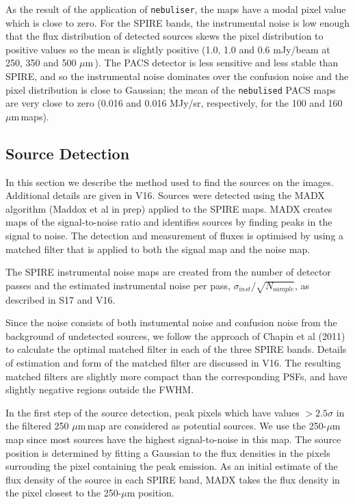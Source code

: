 \documentclass[useAMS,usenatbib]{mnras}
\def\mic{ $\mu $m\,}
\begin{document}
As the result
of the application of {\tt nebuliser}, the maps have a modal pixel value which is close to
zero. For the SPIRE bands, the instrumental noise is low enough that
the flux distribution of detected sources skews the pixel distribution to
positive values so the mean is slightly positive (1.0, 1.0 and 0.6
mJy/beam at 250, 350 and 500 \mic).
The PACS detector is less sensitive and less stable than SPIRE, and so the
instrumental noise dominates over the confusion noise and the pixel
distribution is close to Gaussian; the mean of the {\tt nebulised} PACS
maps are very close to zero (0.016 and 0.016
MJy/sr, respectively, for the 100 and 160\mic maps). 

\subsection{Source Detection} 


In this section we describe the method used to find the
sources on the images. Additional details are given in V16.
Sources were detected using the MADX algorithm (Maddox et al in prep)
applied to the SPIRE maps.  MADX creates maps of the signal-to-noise
ratio and identifies sources by finding peaks in the signal to noise. The
detection and measurement of fluxes is optimised by using a matched
filter that is applied to both the signal map and the noise map. 

The SPIRE instrumental noise maps are created from the number of
detector passes and the estimated instrumental noise per pass,
$\sigma_{\mathrm inst} /\sqrt{N_ {\mathrm sample}}$, as described in S17 and V16.

 
Since the noise consists of both instumental noise and
confusion noise from the background of undetected sources, we follow
the approach of Chapin et al (2011) to calculate the optimal matched
filter in each of the three SPIRE bands. Details of estimation and
form of the matched filter are discussed in V16.  The resulting
matched filters are slightly more compact than the corresponding PSFs,
and have slightly negative regions outside the FWHM.  

In the first step of the source detection, peak pixels which have
values $>2.5\sigma$ in the filtered 250\mic map are considered as
potential sources. 
We use the 250-$\mu$m map since most sources
have the highest signal-to-noise in this map.
The source 
position is determined by
fitting a Gaussian to the flux densities in the pixels surrouding
the pixel containing the peak emission.
As an initial estimate of the flux density of the
source in each SPIRE band, MADX takes the flux density in the
pixel closest to the 250-$\mu$m position.
\end{document}
